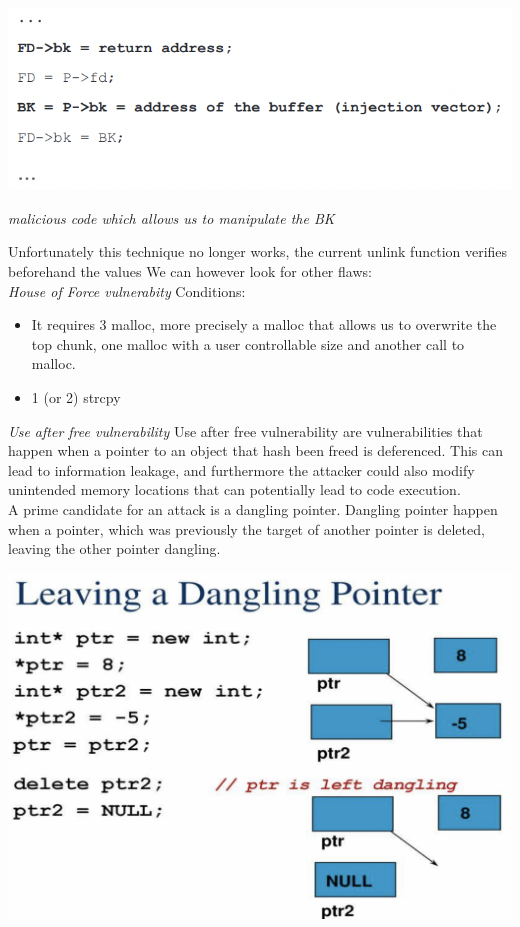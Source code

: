 \documentclass[11pt, oneside]{article}   	%
\begin{document}
\includegraphics[scale = 0.6]{atk2}
\begin{center}
\emph{malicious code which allows us to manipulate the BK}
\end{center}
Unfortunately this technique no longer works, the current unlink function verifies beforehand the values
We can however look for other flaws:\\
\emph{House of Force vulnerabity}
Conditions:
\begin{itemize}
\item It requires 3 malloc, more precisely a malloc that allows us to overwrite the top chunk, one malloc with a user controllable size and another call to malloc.
\item 1 (or 2) strcpy
\end{itemize}
\emph{Use after free vulnerability}
Use after free vulnerability are vulnerabilities that happen when a  pointer to an object that hash been freed is deferenced. This can lead to information leakage, and furthermore the attacker could also modify unintended memory locations that can potentially lead to code execution.\\
A prime candidate for an attack is a dangling pointer. Dangling pointer happen when a pointer, which was previously the target of another pointer is deleted, leaving the other pointer dangling.\\
\begin{center}
\includegraphics[scale = 0.6]{dpointer}
\end{center}
\end{document}
